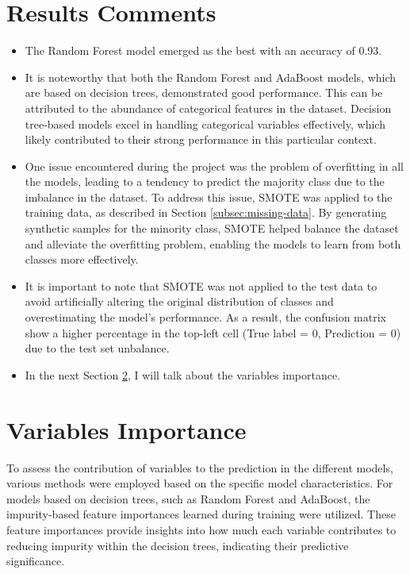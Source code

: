 \documentclass{article}
\begin{document}
\section{Results Comments}\label{sec:comments}
\begin{itemize}
    \item The Random Forest model emerged as the best with an accuracy of 0.93.
    \item It is noteworthy that both the Random Forest and AdaBoost models, which are based on decision trees, demonstrated good performance. This can be attributed to the abundance of categorical features in the dataset. Decision tree-based models excel in handling categorical variables effectively, which likely contributed to their strong performance in this particular context.
    \item One issue encountered during the project was the problem of overfitting in all the models, leading to a tendency to predict the majority class due to the imbalance in the dataset. To address this issue, SMOTE was applied to the training data, as described in Section \ref{subsec:missing-data}. By generating synthetic samples for the minority class, SMOTE helped balance the dataset and alleviate the overfitting problem, enabling the models to learn from both classes more effectively.
    \item It is important to note that SMOTE was not applied to the test data to avoid artificially altering the original distribution of classes and overestimating the model's performance. As a result, the confusion matrix show a higher percentage in the top-left cell (True label = 0, Prediction = 0) due to the test set unbalance.
    \item In the next Section \ref{sec:importance}, I will talk about the variables importance.
\end{itemize}

\section{Variables Importance}\label{sec:importance}
To assess the contribution of variables to the prediction in the different models, various methods were employed based on the specific model characteristics.
For models based on decision trees, such as Random Forest and AdaBoost, the impurity-based feature importances learned during training were utilized. These feature importances provide insights into how much each variable contributes to reducing impurity within the decision trees, indicating their predictive significance.
\end{document}
